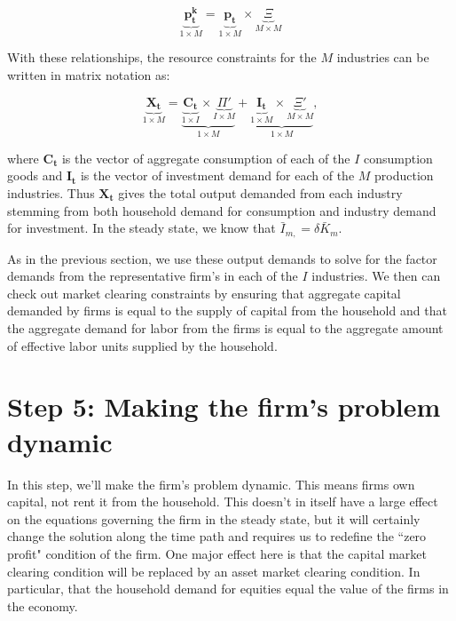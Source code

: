 \documentclass[letterpaper,12pt]{article}
\theoremstyle{definition}
\begin{document}
\begin{spacing}{1.5}
\begin{equation}
\label{eqn:capital_prices}
\underbrace{\boldsymbol{p^{k}_{t}}}_{1\times M} =\underbrace{\boldsymbol{p_{t}}}_{1\times M} \times  \underbrace{\Xi}_{M\times M}
\end{equation}

With these relationships, the resource constraints for the $M$ industries can be written in matrix notation as:

\begin{equation}
\label{eqn:matrix_rc}
\underbrace{\boldsymbol{X_{t}}}_{1\times M} = \underbrace{\underbrace{\boldsymbol{C_{t}}}_{1\times I} \times  \underbrace{\Pi'}_{I\times M}}_{1\times M} + \underbrace{\underbrace{\boldsymbol{I_{t}}}_{1\times M} \times  \underbrace{\Xi'}_{M\times M}}_{1\times M}, 
\end{equation}

\noindent\noindent where $\boldsymbol{C_{t}}$ is the vector of aggregate consumption of each of the $I$ consumption goods and $\boldsymbol{I_{t}}$ is the vector of investment demand for each of the $M$ production industries.  Thus $\boldsymbol{X_{t}}$ gives the total output demanded from each industry stemming from both household demand for consumption and industry demand for investment.  In the steady state, we know that $\bar{I}_{m,}=\delta \bar{K}_{m}$.  

As in the previous section, we use these output demands to solve for the factor demands from the representative firm's in each of the $I$ industries.  We then can check out market clearing constraints by ensuring that aggregate capital demanded by firms is equal to the supply of capital from the household and that the aggregate demand for labor from the firms is equal to the aggregate amount of effective labor units supplied by the household.

\section*{Step 5: Making the firm's problem dynamic}

In this step, we'll make the firm's problem dynamic. This means firms own capital, not rent it from the household.  This doesn't in itself have a large effect on the equations governing the firm in the steady state, but it will certainly change the solution along the time path and requires us to redefine the ``zero profit" condition of the firm. One major effect here is that the capital market clearing condition will be replaced by an asset market clearing condition.  In particular, that the household demand for equities equal the value of the firms in the economy.


\end{spacing}
\end{document}
